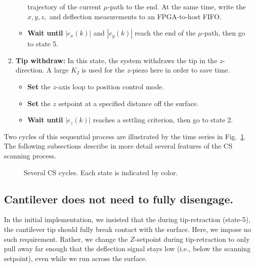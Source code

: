 \documentclass[twocolumn,twoside]{IEEEtran/IEEEtran}
\begin{document}
\begin{enumerate}
\begin{itemize}
    trajectory of the current $\mu$-path to the end. At the same time, write the
    $x,y,z,$ and deflection measurements to an FPGA-to-host FIFO.
  \item \textbf{Wait until} $|e_x(k)|$ and $|e_y(k)|$ reach the end of the
    $\mu$-path,
    then go to state 5.
  \end{itemize}
\item \textbf{Tip withdraw:} In this state, the system withdraws the tip in the
  $z$-direction. A large $K_I$ is used for the $z$-piezo here in order to save
  time.
  \begin{itemize}
  \item \textbf{Set} the $z$-axis loop to position control mode.
  \item \textbf{Set} the $z$ setpoint at a specified distance off the surface.
  \item \textbf{Wait until} $|e_z(k)|$ reaches a settling criterion, then go to
    state 2.
  \end{itemize}
\end{enumerate}
	
Two cycles of this sequential process are illustrated by the time series in
Fig.~\ref{fig:mupathsignaltrajectory}. The following subsections describe in
more detail several features of the CS scanning process.
	

  
\begin{figure}[ht!]
  \centering 
  \caption{Several CS cycles. Each state is indicated by color.}
  \label{fig:mupathsignaltrajectory}
\end{figure}


\subsection{Cantilever does not need to fully disengage.}
In the initial implementation, we insisted that the during tip-retraction
(state-5), the cantilever tip should fully break contact with the surface. Here,
we impose no such requirement. Rather, we change the $Z$-setpoint during
tip-retraction to only pull away far enough that the deflection signal stays low
(i.e., below the scanning setpoint), even while we run across the surface.
\end{document}
